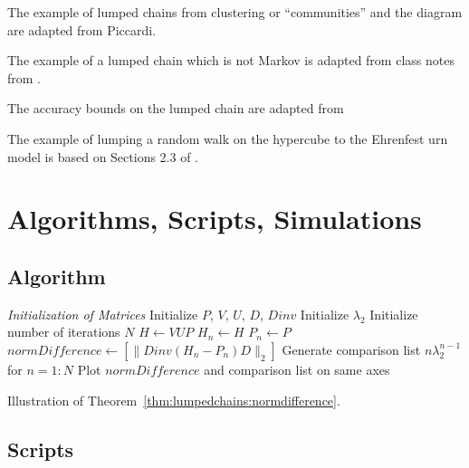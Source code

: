 \documentclass[12pt]{article}
\begin{document}
The example of lumped chains from clustering or ``communities'' and the
diagram are adapted from 
{Piccardi}.

The example of a lumped chain which is not Markov is adapted from class
notes from .

The accuracy bounds on the lumped chain are adapted from
\cite{HOFFMANN20091471}

The example of lumping a random walk on the hypercube to the Ehrenfest
urn model is based on Sections 2.3 of
\cite{levin09}.

\nocite{}
\nocite{}

\hr

\section*{Algorithms, Scripts, Simulations}

\subsection*{Algorithm}
\begin{algorithm}[H]
  \DontPrintSemicolon
  \BlankLine
  \emph{Initialization of Matrices}\;
  Initialize \( P \), \( V \), \( U \), \( D \), \(Dinv \)\;
  Initialize \( \lambda_2 \)\;
  Initialize number of iterations \( N \)\;
  \( H \leftarrow VUP \)\;
  \( H_n \leftarrow H \)\;
  \( P_n \leftarrow P \)\;
  \BlankLine
  \( normDifference \leftarrow [ \| Dinv (H_n - P_n) D \|_2 ]\)\;
  Generate comparison list \( n \lambda_2^{n-1} \) for \(n = 1:N \)\;
  Plot \( normDifference \) and comparison list on same axes\;
  \caption{Illustration of Theorem~\ref{thm:lumpedchains:normdifference}.}
\end{algorithm}
\subsection*{Scripts}
\end{document}
